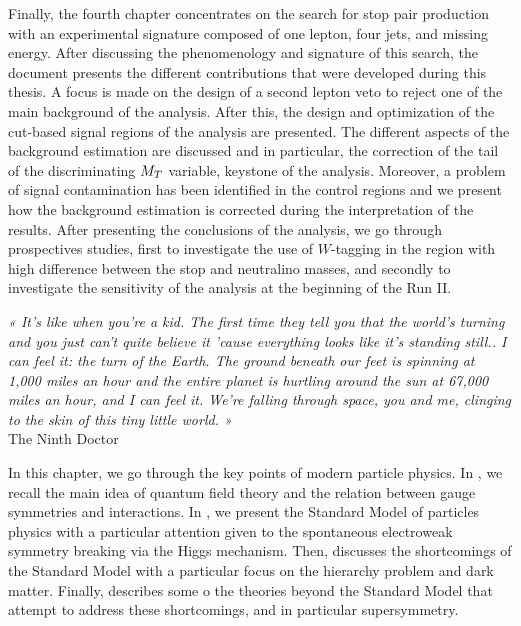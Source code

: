 Finally, the fourth chapter concentrates on the search for stop pair production with an
experimental signature composed of one lepton, four jets, and missing energy. After
discussing the phenomenology and signature of this search, the document presents the
different contributions that were developed during this thesis.
A focus is made on the design of a second lepton veto to reject one of the main background
of the analysis. After this, the design and optimization of the cut-based signal regions
of the analysis are presented. The different aspects of the background estimation are
discussed and in particular, the correction of the tail of the discriminating $M_T$
variable, keystone of the analysis. Moreover, a problem of signal contamination has been
identified in the control regions and we present how the background estimation is corrected
during the interpretation of the results. After presenting the conclusions of the analysis,
we go through prospectives studies, first to investigate the use of $W$-tagging in the
region with high difference between the stop and neutralino masses, and secondly to
investigate the sensitivity of the analysis at the beginning of the Run II.

\setcounter{mtc}{2}
\vspace*{-0.7cm}
\begin{center}
\begin{minipage}{0.95\textwidth}
\emph{« It’s like when you’re a kid. The first time they tell you that the world’s turning
and you just can’t quite believe it ’cause everything looks like it’s standing still.. I
can feel it: the turn of the Earth. The ground beneath our feet is spinning at 1,000 miles
an hour and the entire planet is hurtling around the sun at 67,000 miles an hour, and I
can feel it. We’re falling through space, you and me, clinging to the skin of this tiny
little world. »}\\
\hspace*{0.75\textwidth} The Ninth Doctor
\end{minipage}
\end{center}
\minitoc
\newpage

    In this chapter, we go through the key points of modern particle physics. In
    , we recall the main idea of quantum field theory
    and the relation between gauge symmetries and interactions. In ,
    we present the Standard Model of particles physics with a particular attention given
    to the spontaneous electroweak symmetry breaking via the Higgs mechanism. Then,
     discusses the shortcomings of the Standard
    Model with a particular focus on the hierarchy problem and dark matter. Finally,
     describes some o the theories beyond the
    Standard Model that attempt to address these shortcomings, and in particular supersymmetry.

